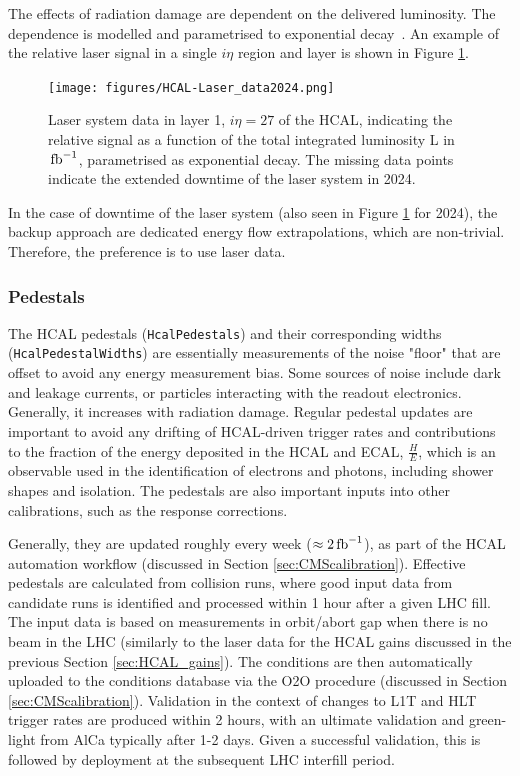 The effects of radiation damage are dependent on the delivered luminosity. The dependence is modelled and parametrised to exponential decay~\cite{CMS:2020mce}. An example of the relative laser signal in a single $i\eta$ region and layer is shown in Figure \ref{fig:HCAL-Laser_data}. 

\begin{figure}[h!]	
\centering
\texttt{[image: figures/HCAL-Laser\_data2024.png]} %
\caption{Laser system data in layer 1, $i\eta = 27$ of the HCAL, indicating the relative signal as a function of the total integrated luminosity L in $\mbox{\ensuremath{\,\text{fb}^{-1}}}$, parametrised as exponential decay. The missing data points indicate the extended downtime of the laser system in 2024.}
\label{fig:HCAL-Laser_data}
\end{figure}

In the case of downtime of the laser system (also seen in Figure \ref{fig:HCAL-Laser_data} for 2024), the backup approach are dedicated energy flow extrapolations, which are non-trivial. Therefore, the preference is to use laser data.

\subsubsection{Pedestals}\label{sec:HCAL_pedestals}
The HCAL pedestals (\texttt{HcalPedestals}) and their corresponding widths (\texttt{HcalPedestalWidths}) are essentially measurements of the noise "floor" that are offset to avoid any energy measurement bias. Some sources of noise include dark and leakage currents, or particles interacting with the readout electronics. Generally, it increases with radiation damage. Regular pedestal updates are important to avoid any drifting of HCAL-driven trigger rates and contributions to the fraction of the energy deposited in the HCAL and ECAL, $\frac{H}{E}$, which is an observable used in the identification of electrons and photons, including shower shapes and isolation. The pedestals are also important inputs into other calibrations, such as the response corrections.

Generally, they are updated roughly every week ($\approx 2 \mbox{\ensuremath{\,\text{fb}^{-1}}}$), as part of the HCAL automation workflow (discussed in Section \ref{sec:CMScalibration}). Effective pedestals are calculated from collision runs, where good input data from candidate runs is identified and processed within 1 hour after a given LHC fill. The input data is based on measurements in orbit/abort gap when there is no beam in the LHC (similarly to the laser data for the HCAL gains discussed in the previous Section \ref{sec:HCAL_gains}). The conditions are then automatically uploaded to the conditions database via the O2O procedure (discussed in Section \ref{sec:CMScalibration}). Validation in the context of changes to L1T and HLT trigger rates are produced within 2 hours, with an ultimate validation and green-light from AlCa typically after 1-2 days. Given a successful validation, this is followed by deployment at the subsequent LHC interfill period.

